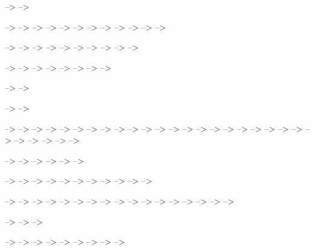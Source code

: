 \documentclass[
]{article}
\begin{document}
--\textgreater{} --\textgreater{}

--\textgreater{} --\textgreater{} --\textgreater{} --\textgreater{}
--\textgreater{} --\textgreater{} --\textgreater{} --\textgreater{}
--\textgreater{} --\textgreater{} --\textgreater{} --\textgreater{}

--\textgreater{} --\textgreater{} --\textgreater{} --\textgreater{}
--\textgreater{} --\textgreater{} --\textgreater{} --\textgreater{}
--\textgreater{} --\textgreater{}

--\textgreater{} --\textgreater{} --\textgreater{} --\textgreater{}
--\textgreater{} --\textgreater{} --\textgreater{} --\textgreater{}

--\textgreater{} --\textgreater{}

--\textgreater{} --\textgreater{}

--\textgreater{} --\textgreater{} --\textgreater{} --\textgreater{}
--\textgreater{} --\textgreater{} --\textgreater{} --\textgreater{}
--\textgreater{} --\textgreater{} --\textgreater{} --\textgreater{}
--\textgreater{} --\textgreater{} --\textgreater{} --\textgreater{}
--\textgreater{} --\textgreater{} --\textgreater{} --\textgreater{}
--\textgreater{} --\textgreater{} --\textgreater{} --\textgreater{}
--\textgreater{} --\textgreater{} --\textgreater{} --\textgreater{}

--\textgreater{} --\textgreater{} --\textgreater{} --\textgreater{}
--\textgreater{} --\textgreater{}

--\textgreater{} --\textgreater{} --\textgreater{} --\textgreater{}
--\textgreater{} --\textgreater{} --\textgreater{} --\textgreater{}
--\textgreater{} --\textgreater{} --\textgreater{}

--\textgreater{} --\textgreater{} --\textgreater{} --\textgreater{}
--\textgreater{} --\textgreater{} --\textgreater{} --\textgreater{}
--\textgreater{} --\textgreater{} --\textgreater{} --\textgreater{}
--\textgreater{} --\textgreater{} --\textgreater{} --\textgreater{}
--\textgreater{}

--\textgreater{} --\textgreater{} --\textgreater{}

--\textgreater{} --\textgreater{} --\textgreater{} --\textgreater{}
--\textgreater{} --\textgreater{} --\textgreater{} --\textgreater{}
--\textgreater{}
\end{document}
